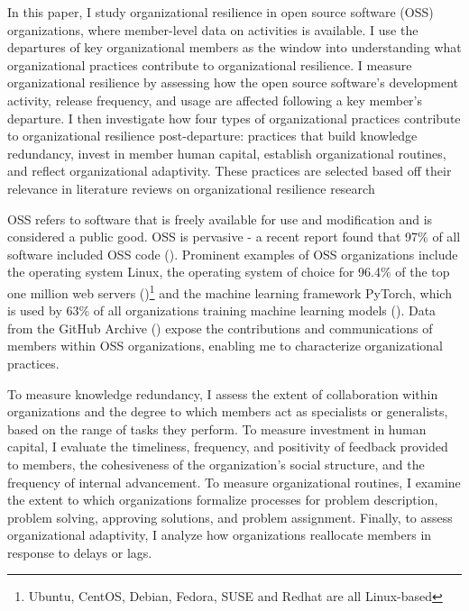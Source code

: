 \documentclass[12pt,notitlepage]{article}
\begin{document}
In this paper, I study organizational resilience in open source software (OSS) organizations, where member-level data on activities is available. 
I use the departures of key organizational members as the window into understanding what organizational practices contribute to organizational resilience. 
I measure organizational resilience by assessing how the open source software's development activity, release frequency, and usage are affected following a key member’s departure.
I then investigate how four types of organizational practices contribute to organizational resilience post-departure: practices that build knowledge redundancy, invest in member human capital, establish organizational routines, and reflect organizational adaptivity.  
These practices are selected based off their relevance in literature reviews on organizational resilience research





OSS refers to software that is freely available for use and modification and is considered a public good. 
OSS is pervasive - a recent report found that 97\% of all software included OSS code (\cite{fred_bals_six_2025}). 
Prominent examples of OSS organizations include the operating system Linux, the operating system of choice for 96.4\% of the top one million web servers (\cite{w3cook_os_2015})\footnote{Ubuntu, CentOS, Debian, Fedora, SUSE and Redhat are all Linux-based} and the machine learning framework PyTorch, which is used by 63\% of all organizations training machine learning models (\cite{lawson_shaping_2024}). 
Data from the GitHub Archive (\cite{github_archive_github_2025}) expose the contributions and communications of members within OSS organizations, enabling me to characterize organizational practices. 

To measure knowledge redundancy, I assess the extent of collaboration within organizations and the degree to which members act as specialists or generalists, based on the range of tasks they perform. To measure investment in human capital, I evaluate the timeliness, frequency, and positivity of feedback provided to members, the cohesiveness of the organization's social structure, and the frequency of internal advancement. To measure organizational routines, I examine the extent to which organizations formalize processes for problem description, problem solving, approving solutions, and problem assignment. Finally, to assess organizational adaptivity, I analyze how organizations reallocate members in response to delays or lags.
\end{document}
